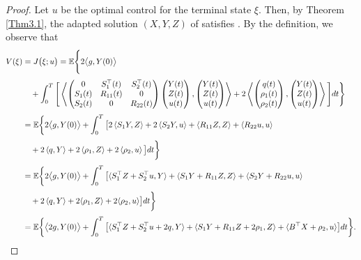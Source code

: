 \documentclass[11pt,times,twoside]{article}
\def\dbE{\mathbb{E}} \def\sE{\mathscr{E}} \def\fE{\mathfrak{E}} \def\cE{{\cal E}} \def\BE{{\bf E}} \def\Be{{\bf e}}
\begin{document}
\begin{proof}
Let $u$ be the optimal control for the terminal state $\xi$. Then, by Theorem \ref{Thm3.1}, the
adapted solution $(X,Y,Z)$ of  satisfies . By the definition, we observe that
%
%
\begin{align*}
\ds V(\xi) &= J\big(\xi;u\big)=\dbE\Bigg\{2\big\lan g,Y(0)\big\ran\\
%
\ns\ds &\q +\int_0^T\Bigg[
\llan\begin{pmatrix}0&S_1^\top(t)&S_2^\top(t)\\S_1(t)&R_{11}(t)&0\\S_2(t)&0&R_{22}(t) \end{pmatrix}
\begin{pmatrix}Y(t)\\Z(t)\\u(t)\end{pmatrix},
\begin{pmatrix}Y(t)\\Z(t)\\u(t)\end{pmatrix}\rran
+2\llan\begin{pmatrix}q(t)\\ \rho_1(t)\\ \rho_2(t) \end{pmatrix},
   \begin{pmatrix}Y(t)\\Z(t)\\u(t)\end{pmatrix}\rran\Bigg] dt\Bigg\}\\
%
%
\ns\ds &= \dbE  \bigg\{2\big\lan g,Y(0)\big\ran+\int_{0}^{T}\big[2\left\lan  S_{1} Y, Z\right\ran +2\left\lan  S_{2} Y, u\right\ran +\left\lan  R_{11} Z, Z\right\ran +\left\lan  R_{22} u, u\right\ran \\
\ns\ds &\q
+2\left\lan  q,Y\right\ran  + 2\left\lan  \rho_1,Z\right\ran  + 2\left\lan  \rho_2,u\right\ran  \big] d t \bigg\}\\
%
\ns\ds &= \dbE  \bigg\{2\big\lan g,Y(0)\big\ran+
\int_{0}^{T}\big[\lan  S_{1}^{\top} Z+S_{2}^{\top} u, Y\ran +\lan  S_{1} Y+R_{11} Z, Z\ran +\lan  S_{2} Y+R_{22} u, u\ran \\
%
\ns\ds &\q
+2\left\lan  q,Y\right\ran + 2\lan\rho_1,Z\ran  + 2\lan\rho_2,u\ran\big] dt \bigg\}\\
%
\ns\ds &= \dbE  \bigg\{\big\lan 2g,Y(0)\big\ran+
\int_{0}^{T}\big[\lan  S_{1}^{\top} Z+S_{2}^{\top} u +2q, Y\ran +\lan  S_{1} Y+R_{11} Z +2\rho_1, Z\ran +\lan   B^{\top} X +\rho_2, u\ran
\big] d t \bigg\}.
%
\end{align*}

\end{proof}
\end{document}
